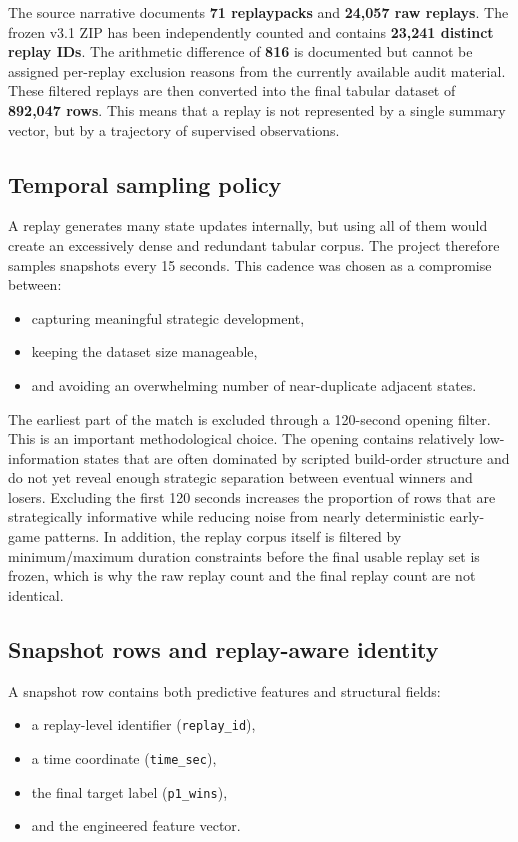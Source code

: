 \documentclass[11pt,a4paper]{article}
\begin{document}
The source narrative documents \textbf{71 replaypacks} and \textbf{24,057 raw replays}. The frozen v3.1 ZIP has been independently counted and contains \textbf{23,241 distinct replay IDs}. The arithmetic difference of \textbf{816} is documented but cannot be assigned per-replay exclusion reasons from the currently available audit material. These filtered replays are then converted into the final tabular dataset of \textbf{892,047 rows}. This means that a replay is not represented by a single summary vector, but by a trajectory of supervised observations.

\subsection{Temporal sampling policy}
A replay generates many state updates internally, but using all of them would create an excessively dense and redundant tabular corpus. The project therefore samples snapshots every 15 seconds. This cadence was chosen as a compromise between:
\begin{itemize}
    \item capturing meaningful strategic development,
    \item keeping the dataset size manageable,
    \item and avoiding an overwhelming number of near-duplicate adjacent states.
\end{itemize}

The earliest part of the match is excluded through a 120-second opening filter. This is an important methodological choice. The opening contains relatively low-information states that are often dominated by scripted build-order structure and do not yet reveal enough strategic separation between eventual winners and losers. Excluding the first 120 seconds increases the proportion of rows that are strategically informative while reducing noise from nearly deterministic early-game patterns. In addition, the replay corpus itself is filtered by minimum/maximum duration constraints before the final usable replay set is frozen, which is why the raw replay count and the final replay count are not identical.

\subsection{Snapshot rows and replay-aware identity}
A snapshot row contains both predictive features and structural fields:
\begin{itemize}
    \item a replay-level identifier (\texttt{replay\_id}),
    \item a time coordinate (\texttt{time\_sec}),
    \item the final target label (\texttt{p1\_wins}),
    \item and the engineered feature vector.
\end{itemize}
\end{document}
